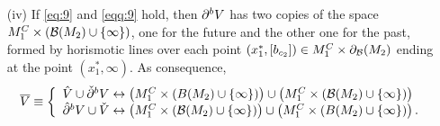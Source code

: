 \begin{thm}
\begin{itemize}
            \item[(iv)] If \eqref{eq:9} and \eqref{eqq:9} hold, then $\partial^{b} V$ has two copies of the space $M_1^C\times \left({\cal B}(M_2)\cup \{\infty\}\right)$, one for the future and the other one for the past, formed by horismotic lines over each point $(x_1^*,[b_{c_2}])\in M_1^C\times \partial_{\cal B}(M_2)$ ending at the point $(x_1^*,\infty)$. As consequence,
              \[
                  \overline{V}\equiv \left\{\begin{array}{l} \hat{V}\cup \check{\partial}^{b}V \leftrightarrow \left(M_1^C\times \left(B(M_2)\cup \{\infty\} \right)\right) \cup \left(M_1^C\times \left({\cal B}(M_2)\cup \{\infty\}\right)\right) \\
                  \hat{\partial}^{b} V\cup \check{V} \leftrightarrow \left( M_1^C\times \left({\cal B}(M_2)\cup \{\infty\}\right)\right) \cup  \left(M_1^C\times \left(B(M_2)\cup \{\infty\}\right)\right).
                \end{array}\right.
            \]
      \end{itemize}
    \end{thm}
